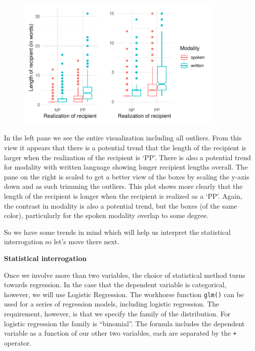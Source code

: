 \documentclass[
  letterpaper,
]{latex/krantz}
\begin{document}
\begin{figure}[H]

{\centering \includegraphics[width=0.9\textwidth,height=\textheight]{./inference_files/figure-pdf/i-multi-cat-visual-1.pdf}

}

\end{figure}

In the left pane we see the entire visualization including all outliers.
From this view it appears that there is a potential trend that the
length of the recipient is larger when the realization of the recipient
is `PP'. There is also a potential trend for modality with written
language showing longer recipient lengths overall. The pane on the right
is scaled to get a better view of the boxes by scaling the y-axis down
and as such trimming the outliers. This plot shows more clearly that the
length of the recipient is longer when the recipient is realized as a
`PP'. Again, the contrast in modality is also a potential trend, but the
boxes (of the same color), particularly for the spoken modality overlap
to some degree.

So we have some trends in mind which will help us interpret the
statistical interrogation so let's move there next.

\textbf{Statistical interrogation}

Once we involve more than two variables, the choice of statistical
method turns towards regression. In the case that the dependent variable
is categorical, however, we will use Logistic Regression. The workhorse
function \texttt{glm()} can be used for a series of regression models,
including logistic regression. The requirement, however, is that we
specify the family of the distribution. For logistic regression the
family is ``binomial''. The formula includes the dependent variable as a
function of our other two variables, each are separated by the
\texttt{+} operator.
\end{document}
